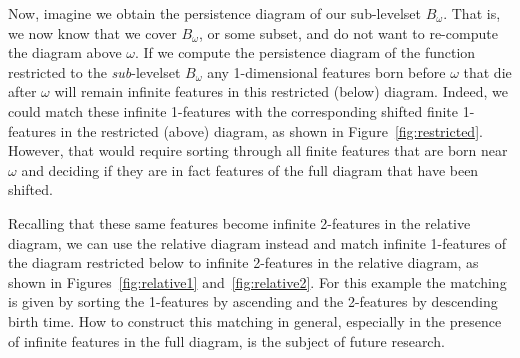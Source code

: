 Now, imagine we obtain the persistence diagram of our sub-levelset $B_\omega$.
That is, we now know that we cover $B_\omega$, or some subset, and do not want to re-compute the diagram above $\omega$.
If we compute the persistence diagram of the function restricted to the \emph{sub}-levelset $B_\omega$ any 1-dimensional features born before $\omega$ that die after $\omega$ will remain infinite features in this restricted (below) diagram.
Indeed, we could match these infinite 1-features with the corresponding shifted finite 1-features in the restricted (above) diagram, as shown in Figure~\ref{fig:restricted}.
However, that would require sorting through all finite features that are born near $\omega$ and deciding if they are in fact features of the full diagram that have been shifted.

Recalling that these same features become infinite 2-features in the relative diagram, we can use the relative diagram instead and match infinite 1-features of the diagram restricted below to infinite 2-features in the relative diagram, as shown in Figures~\ref{fig:relative1} and~\ref{fig:relative2}.
For this example the matching is given by sorting the 1-features by ascending and the 2-features by descending birth time.
How to construct this matching in general, especially in the presence of infinite features in the full diagram, is the subject of future research.

